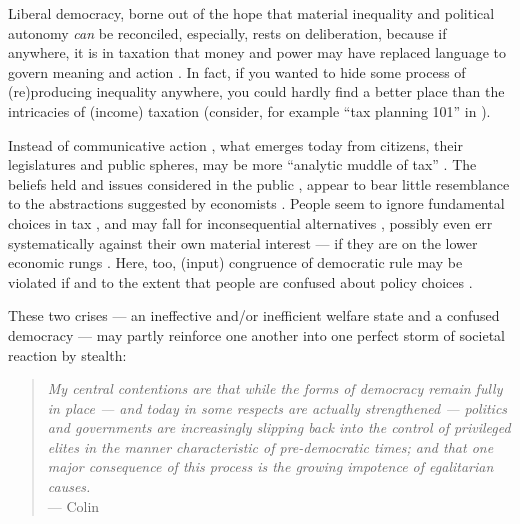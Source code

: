 

Liberal democracy, borne out of the hope that material inequality and political autonomy \emph{can} be reconciled, %
especially, rests on deliberation, because if anywhere, it is in taxation that money and power may have replaced language to govern meaning and action \citep{Habermas-1971}.
In fact, if you wanted to hide some process of (re)producing inequality anywhere, you could hardly find a better place than the intricacies of (income) taxation (consider, for example ``tax planning 101'' in \citealt[888]{McCaffery2005}). 

Instead of communicative action \citep{Habermas-1984}, what emerges today from citizens, their legislatures and public spheres, may be more ``analytic muddle of tax'' \citep[862]{McCaffery2005}.
The beliefs held and issues considered in the public \citep[for example,][]{Caplan2007}, appear to bear little resemblance to the abstractions suggested by economists \cite[for example,][]{Harberger1974}.
People seem to ignore fundamental choices in tax \citep[for example,][]{McCafferyHines2010}, and may fall for inconsequential alternatives \citep[for example,][]{SausgruberTyran2011}, possibly even err systematically against their own material interest --- if they are on the lower economic rungs \citep[for a German example,][]{Kemmerling2009}.
Here, too, (input) congruence of democratic rule may be violated if and to the extent that people are confused about policy choices \citep[compare][90]{Zurn-2000-aa}.

These two crises --- an ineffective and/or inefficient welfare state and a confused democracy --- may partly reinforce one another into one perfect storm of societal reaction by stealth: 
\begin{quote}
	\emph{
	My central contentions are that while the forms of democracy remain fully in place --- and today in some respects are actually strengthened --- politics and governments are increasingly slipping back into the control of privileged elites in the manner characteristic of pre-democratic times; and that one major consequence of this process is the growing impotence of egalitarian causes.}\\
	--- Colin \citet[6]{Crouch2004}
\end{quote}

